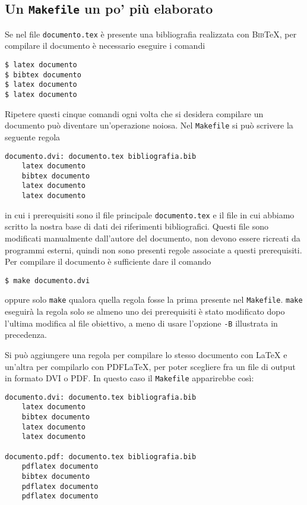 \subsection{Un \texttt{Makefile} un po' più elaborato}
\label{sec:makefile-elaborato}

Se nel file \texttt{documento.tex} è presente una bibliografia realizzata con
\textsc{Bib}\TeX, per compilare il documento è necessario eseguire i comandi
\begin{verbatim}
$ latex documento
$ bibtex documento
$ latex documento
$ latex documento
\end{verbatim}
Ripetere questi cinque comandi ogni volta che si desidera compilare un documento
può diventare un'operazione noiosa.  Nel \texttt{Makefile} si può scrivere la
seguente regola
\begin{lstlisting}
documento.dvi: documento.tex bibliografia.bib
	latex documento
	bibtex documento
	latex documento
	latex documento
\end{lstlisting}
in cui i prerequisiti sono il file principale \texttt{documento.tex} e il file
in cui abbiamo scritto la nostra base di dati dei riferimenti bibliografici.
Questi file sono modificati manualmente dall'autore del documento, non devono
essere ricreati da programmi esterni, quindi non sono presenti regole associate
a questi prerequisiti.  Per compilare il documento è sufficiente dare il comando
\begin{verbatim}
$ make documento.dvi
\end{verbatim} %
oppure solo \texttt{make} qualora quella regola fosse la prima presente nel
\texttt{Makefile}.  \texttt{make} eseguirà la regola solo se almeno uno dei
prerequisiti è stato modificato dopo l'ultima modifica al file obiettivo, a meno
di usare l'opzione \texttt{-B} illustrata in precedenza.

Si può aggiungere una regola per compilare lo stesso documento con \LaTeX{}
e un'altra per compilarlo con \textsc{PDF}\LaTeX, per poter scegliere fra un
file di output in formato \textsc{DVI} o \textsc{PDF}.  In questo caso il
\texttt{Makefile} apparirebbe così:
\begin{lstlisting}[caption={La prima regola permette di compilare un documento con
\LaTeX, la seconda con \textsc{PDF}\LaTeX.},label=lst:dvi-pdf]
documento.dvi: documento.tex bibliografia.bib
	latex documento
	bibtex documento
	latex documento
	latex documento

documento.pdf: documento.tex bibliografia.bib
	pdflatex documento
	bibtex documento
	pdflatex documento
	pdflatex documento
\end{lstlisting}

